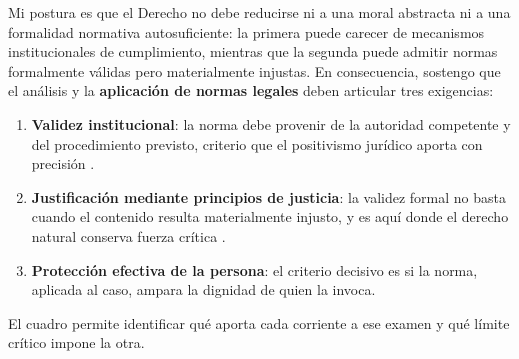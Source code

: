 \documentclass[
	spanish, %
	letterpaper, oneside
]{article}
\begin{document}
Mi postura es que el Derecho no debe reducirse ni a una moral abstracta ni a una formalidad normativa autosuficiente: la primera puede carecer de mecanismos institucionales de cumplimiento, mientras que la segunda puede admitir normas formalmente válidas pero materialmente injustas. En consecuencia, sostengo que el análisis y la \textbf{aplicación de normas legales} deben articular tres exigencias:

\begin{enumerate}
  \item \textbf{Validez institucional}: la norma debe provenir de la autoridad competente y del procedimiento previsto, criterio que el positivismo jurídico aporta con precisión \citep{lovonManualPracticoFilosofia2020}.
  \item \textbf{Justificación mediante principios de justicia}: la validez formal no basta cuando el contenido resulta materialmente injusto, y es aquí donde el derecho natural conserva fuerza crítica \citep{rojas-gonzalezFilosofiaDerecho2018}.
  \item \textbf{Protección efectiva de la persona}: el criterio decisivo es si la norma, aplicada al caso, ampara la dignidad de quien la invoca.
\end{enumerate}

El cuadro permite identificar qué aporta cada corriente a ese examen y qué límite crítico impone la otra.
\end{document}
